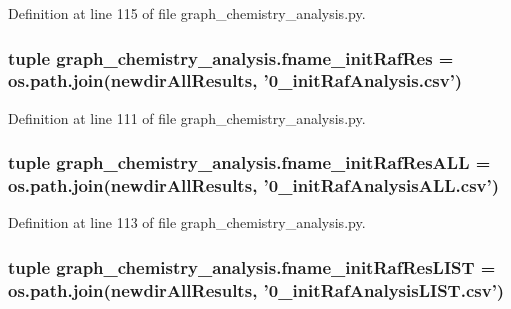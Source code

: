 Definition at line 115 of file graph\-\_\-chemistry\-\_\-analysis.\-py.

\hypertarget{a00103_ae61b55457549e0a6028d8933d0b31d00}{
\subsubsection[{fname\-\_\-init\-Raf\-Res}]{\setlength{\rightskip}{0pt plus 5cm}tuple graph\-\_\-chemistry\-\_\-analysis.\-fname\-\_\-init\-Raf\-Res = os.\-path.\-join({\bf newdir\-All\-Results}, '0\-\_\-init\-Raf\-Analysis.\-csv')}}\label{a00103_ae61b55457549e0a6028d8933d0b31d00}


Definition at line 111 of file graph\-\_\-chemistry\-\_\-analysis.\-py.

\hypertarget{a00103_a950ae7a4f866dc7a17dd7ba635e0d2cd}{
\subsubsection[{fname\-\_\-init\-Raf\-Res\-A\-L\-L}]{\setlength{\rightskip}{0pt plus 5cm}tuple graph\-\_\-chemistry\-\_\-analysis.\-fname\-\_\-init\-Raf\-Res\-A\-L\-L = os.\-path.\-join({\bf newdir\-All\-Results}, '0\-\_\-init\-Raf\-Analysis\-A\-L\-L.\-csv')}}\label{a00103_a950ae7a4f866dc7a17dd7ba635e0d2cd}


Definition at line 113 of file graph\-\_\-chemistry\-\_\-analysis.\-py.

\hypertarget{a00103_a5f7aa907185951a89bae40e384167bff}{
\subsubsection[{fname\-\_\-init\-Raf\-Res\-L\-I\-S\-T}]{\setlength{\rightskip}{0pt plus 5cm}tuple graph\-\_\-chemistry\-\_\-analysis.\-fname\-\_\-init\-Raf\-Res\-L\-I\-S\-T = os.\-path.\-join({\bf newdir\-All\-Results}, '0\-\_\-init\-Raf\-Analysis\-L\-I\-S\-T.\-csv')}}\label{a00103_a5f7aa907185951a89bae40e384167bff}


